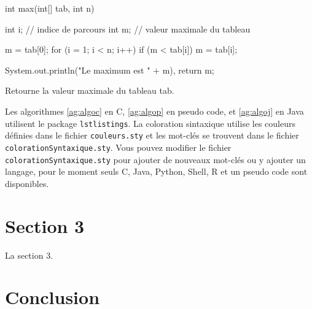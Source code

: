 \begin{algorithm}
  \begin{Java}
int max(int[] tab, int n) {
  int i; // indice de parcours
  int m; // valeur maximale du tableau
  
  m = tab[0];
  for (i = 1; i < n; i++) {
    if (m < tab[i]) {
      m = tab[i];
    }
  }
  
  System.out.println("Le maximum est " + m),
  return m;
}
  \end{Java}
  \caption[Algo en Java]{Retourne la valeur maximale du tableau tab.\label{ag:algoj}}
\end{algorithm}

Les algorithmes \ref{ag:algoc} en C, \ref{ag:algop} en pseudo code, et \ref{ag:algoj} en Java utilisent le package \texttt{lstlistings}. La coloration sintaxique utilise les couleurs définies dans le fichier \texttt{couleurs.sty} et les mot-clés se trouvent dans le fichier \texttt{colorationSyntaxique.sty}. Vous pouvez modifier le fichier \texttt{colorationSyntaxique.sty} pour ajouter de nouveaux mot-clés ou y ajouter un langage, pour le moment seuls C, Java, Python, Shell, R et un pseudo code sont disponibles.

\section{Section 3}

La section 3.

\section{Conclusion}
